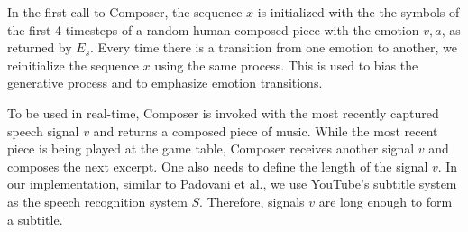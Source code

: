 In the first call to Composer, the sequence $x$
is initialized with the the symbols of the first 4 timesteps of a random human-composed piece with the emotion $v, a$, as returned by $E_s$.
Every time
there is a transition from one emotion to another, we reinitialize the sequence $x$ using the same process. This is used to bias the generative process and to emphasize emotion transitions.

To be used in real-time, Composer is invoked with the most recently captured speech signal $v$ and returns a composed piece of music. While the most recent piece is being played at the game table, Composer receives another signal $v$ and composes the next excerpt. One also needs to define the length of the signal $v$. In our implementation, similar to Padovani et al.\cite{padovani2017}, we use YouTube's subtitle system as the speech recognition system $S$. Therefore, signals $v$ are long enough to form a
subtitle.



